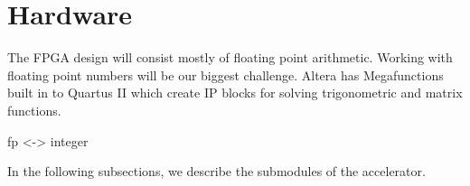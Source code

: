 \section{Hardware}

The FPGA design will consist mostly of floating point arithmetic. Working 
with floating point numbers will be our biggest challenge. Altera has 
Megafunctions built in to Quartus II which create IP blocks for solving trigonometric and matrix functions.

fp <-> integer

In the following subsections, we describe the submodules of the accelerator.





